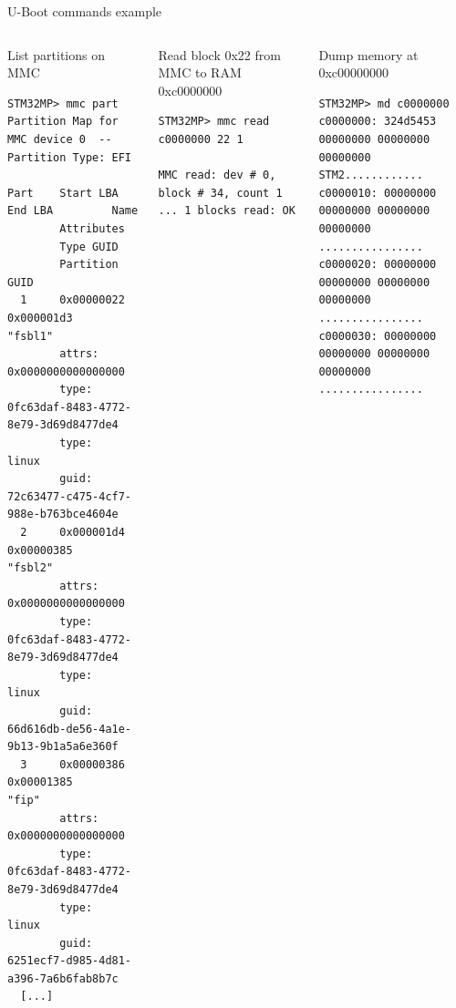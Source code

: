 \begin{frame}[fragile]{U-Boot commands example}
  \begin{columns}
    \begin{block}{List partitions on MMC}
      {\tiny
\begin{verbatim}
STM32MP> mmc part
Partition Map for MMC device 0  --   Partition Type: EFI

Part    Start LBA       End LBA         Name
        Attributes
        Type GUID
        Partition GUID
  1     0x00000022      0x000001d3      "fsbl1"
        attrs:  0x0000000000000000
        type:   0fc63daf-8483-4772-8e79-3d69d8477de4
        type:   linux
        guid:   72c63477-c475-4cf7-988e-b763bce4604e
  2     0x000001d4      0x00000385      "fsbl2"
        attrs:  0x0000000000000000
        type:   0fc63daf-8483-4772-8e79-3d69d8477de4
        type:   linux
        guid:   66d616db-de56-4a1e-9b13-9b1a5a6e360f
  3     0x00000386      0x00001385      "fip"
        attrs:  0x0000000000000000
        type:   0fc63daf-8483-4772-8e79-3d69d8477de4
        type:   linux
        guid:   6251ecf7-d985-4d81-a396-7a6b6fab8b7c
  [...]
\end{verbatim}
      }
    \end{block}

    \begin{block}{Read block 0x22 from MMC to RAM 0xc0000000}
      {\tiny
\begin{verbatim}
STM32MP> mmc read c0000000 22 1

MMC read: dev # 0, block # 34, count 1 ... 1 blocks read: OK
\end{verbatim}
      }
    \end{block}

    \begin{block}{Dump memory at 0xc00000000}
      {\tiny
\begin{verbatim}
STM32MP> md c0000000
c0000000: 324d5453 00000000 00000000 00000000  STM2............
c0000010: 00000000 00000000 00000000 00000000  ................
c0000020: 00000000 00000000 00000000 00000000  ................
c0000030: 00000000 00000000 00000000 00000000  ................
\end{verbatim}
      }
    \end{block}
  \end{columns}
\end{frame}

